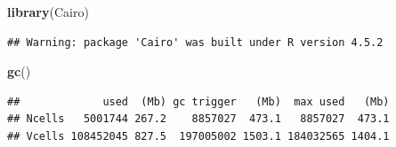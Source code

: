 \documentclass[
]{article}
\newenvironment{Shaded}{\begin{snugshade}}{\end{snugshade}}
\newcommand{\FunctionTok}[1]{\textcolor[rgb]{0.13,0.29,0.53}{\textbf{#1}}}
\newcommand{\NormalTok}[1]{#1}
\begin{document}
\begin{Shaded}
\begin{Highlighting}[]
\FunctionTok{library}\NormalTok{(Cairo)}
\end{Highlighting}
\end{Shaded}

\begin{verbatim}
## Warning: package 'Cairo' was built under R version 4.5.2
\end{verbatim}

\begin{Shaded}
\begin{Highlighting}[]
\FunctionTok{gc}\NormalTok{()}
\end{Highlighting}
\end{Shaded}

\begin{verbatim}
##             used  (Mb) gc trigger   (Mb)  max used   (Mb)
## Ncells   5001744 267.2    8857027  473.1   8857027  473.1
## Vcells 108452045 827.5  197005002 1503.1 184032565 1404.1
\end{verbatim}
\end{document}

